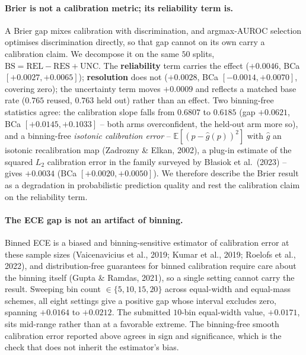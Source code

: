 \documentclass{article}
\begin{document}
\paragraph{Brier is not a calibration metric; its reliability term is.} A Brier
gap mixes calibration with discrimination, and argmax-AUROC selection optimises
discrimination directly, so that gap cannot on its own carry a calibration
claim. We decompose it on the same $50$ splits,
$\mathrm{BS}=\mathrm{REL}-\mathrm{RES}+\mathrm{UNC}$. The \textbf{reliability}
term carries the effect ($+0.0046$, BCa $[+0.0027,+0.0065]$);
\textbf{resolution} does not ($+0.0028$, BCa $[-0.0014,+0.0070]$, covering
zero); the uncertainty term moves $+0.0009$ and reflects a matched base rate
($0.765$ reused, $0.763$ held out) rather than an effect. Two binning-free
statistics agree: the calibration slope falls from $0.6807$ to $0.6185$ (gap
$+0.0621$, BCa $[+0.0145,+0.1033]$ -- both arms overconfident, the held-out arm
more so), and a binning-free \emph{isotonic calibration error} --
$\mathbb{E}[(p-\hat{g}(p))^2]$ with $\hat{g}$ an isotonic recalibration map
(Zadrozny \& Elkan, 2002), a plug-in estimate of the squared $L_2$ calibration
error in the family surveyed by B\l{}asiok et al.\ (2023) -- gives $+0.0034$
(BCa $[+0.0020,+0.0050]$). We therefore describe the Brier result as a degradation
in probabilistic prediction quality and rest the calibration claim on the
reliability term.

\paragraph{The ECE gap is not an artifact of binning.} Binned ECE is a biased and
binning-sensitive estimator of calibration error at these sample sizes
(Vaicenavicius et al., 2019; Kumar et al., 2019; Roelofs et al., 2022), and
distribution-free guarantees for binned calibration require care about the
binning itself (Gupta \& Ramdas, 2021), so a single setting cannot carry the
result. Sweeping bin count
$\in\{5,10,15,20\}$ across equal-width and equal-mass schemes, all eight
settings give a positive gap whose interval excludes zero, spanning $+0.0164$
to $+0.0212$. The submitted $10$-bin equal-width value, $+0.0171$, sits
mid-range rather than at a favorable extreme. The binning-free smooth
calibration error reported above agrees in sign and significance, which is the
check that does not inherit the estimator's bias.
\end{document}
